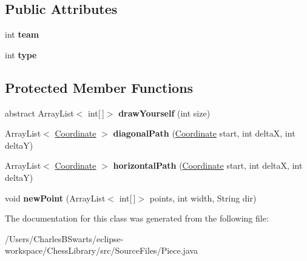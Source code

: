 \subsection*{Public Attributes}
\begin{DoxyCompactItemize}
\item 
\mbox{\label{class_source_files_1_1_piece_ac2df67aee7891ed3358bca05e69004dd}} 
int {\bfseries team}
\item 
\mbox{\label{class_source_files_1_1_piece_adace1c175f7110d4dea78e90eb115f65}} 
int {\bfseries type}
\end{DoxyCompactItemize}
\subsection*{Protected Member Functions}
\begin{DoxyCompactItemize}
\item 
\mbox{\label{class_source_files_1_1_piece_ac9c69ae74a8a857fa5b6f0b670fe8763}} 
abstract Array\+List$<$ int\mbox{[}$\,$\mbox{]}$>$ {\bfseries draw\+Yourself} (int size)
\item 
\mbox{\label{class_source_files_1_1_piece_a4de07a0ea658f8fa33844fcd76970a40}} 
Array\+List$<$ \mbox{\hyperlink{class_source_files_1_1_coordinate}{Coordinate}} $>$ {\bfseries diagonal\+Path} (\mbox{\hyperlink{class_source_files_1_1_coordinate}{Coordinate}} start, int deltaX, int deltaY)
\item 
\mbox{\label{class_source_files_1_1_piece_af895622fde0a44fb85a9c8600cef2eac}} 
Array\+List$<$ \mbox{\hyperlink{class_source_files_1_1_coordinate}{Coordinate}} $>$ {\bfseries horizontal\+Path} (\mbox{\hyperlink{class_source_files_1_1_coordinate}{Coordinate}} start, int deltaX, int deltaY)
\item 
\mbox{\label{class_source_files_1_1_piece_a9e9c00c22f7ba2396a09f231c976e792}} 
void {\bfseries new\+Point} (Array\+List$<$ int\mbox{[}$\,$\mbox{]}$>$ points, int width, String dir)
\end{DoxyCompactItemize}


The documentation for this class was generated from the following file\+:\begin{DoxyCompactItemize}
\item 
/\+Users/\+Charles\+B\+Swarts/eclipse-\/workspace/\+Chess\+Library/src/\+Source\+Files/Piece.\+java\end{DoxyCompactItemize}
